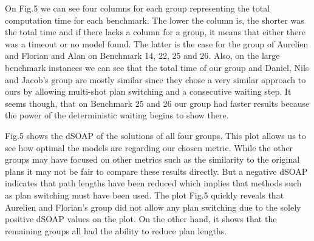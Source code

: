 \documentclass{llncs}
\begin{document}
On Fig.5 we can see four columns for each group representing the total computation time for each benchmark. The lower the column is, the shorter was the total time and if there lacks a column for a group, it means that either there was a timeout or no model found. The latter is the case for the group of Aurelien and Florian \cite{project2} and Alan \cite{project3} on Benchmark 14, 22, 25 and 26.
Also, on the large benchmark instances we can see that the total time of our group \cite{project1} and Daniel, Nils and Jacob's group \cite{project4} are mostly similar since they chose a very similar approach to ours by allowing multi-shot plan switching and a consecutive waiting step. It seems though, that on Benchmark 25 and 26 our group had faster results because the power of the deterministic waiting begins to show there.

Fig.5 shows the dSOAP of the solutions of all four groups. This plot allows us to see how optimal the models are regarding our chosen metric. While the other groups may have focused on other metrics such as the similarity to the original plans it may not be fair to compare these results directly. But a negative dSOAP indicates that path lengths have been reduced which implies that methods such as plan switching must have been used.
The plot Fig.5 quickly reveals that Aurelien and Florian's group \cite{project2} did not allow any plan switching due to the solely positive dSOAP values on the plot. On the other hand, it shows that the remaining groups all had the ability to reduce plan lengths.
\end{document}
